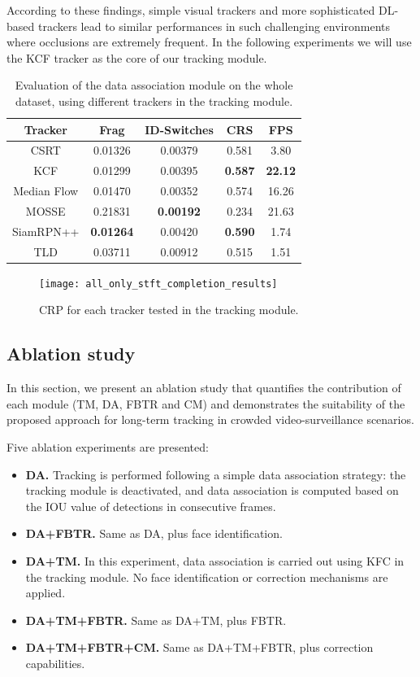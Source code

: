 According to these findings, simple visual trackers and more sophisticated DL-based trackers lead to similar performances in such challenging environments where occlusions are extremely frequent. In the following experiments we will use the KCF tracker as the core of our tracking module.

\begin{table}[h]
    \centering
    \small
    \begin{tabular}{ccccc}
        \toprule
        Tracker & Frag & ID-Switches & CRS & FPS\\
        \midrule
        CSRT & 0.01326 & 0.00379 & 0.581 & 3.80\\
        KCF & 0.01299 & 0.00395 & \textbf{0.587} & \textbf{22.12}\\
        Median Flow & 0.01470 & 0.00352 & 0.574 & 16.26\\
        MOSSE & 0.21831 & \textbf{0.00192} & 0.234 & 21.63\\
        SiamRPN++ & \textbf{0.01264} & 0.00420 & \textbf{0.590} & 1.74\\
        TLD & 0.03711 & 0.00912 & 0.515 & 1.51\\
        \bottomrule
    \end{tabular}
    \caption{Evaluation of the data association module on the whole dataset, using different trackers in the tracking module.}
    \label{tab:results_STFT}
\end{table}

\begin{figure}[h]
    \centering
    \texttt{[image: all\_only\_stft\_completion\_results]}
    \caption{CRP for each tracker tested in the tracking module.}
    \label{fig:stft_CRP}
\end{figure}


\subsection{Ablation study}

In this section, we present an ablation study that quantifies the contribution of each module (TM, DA, FBTR and CM) and demonstrates the suitability of the proposed approach for long-term tracking in crowded video-surveillance scenarios.

Five ablation experiments are presented: 

\begin{itemize}
    \item \textbf{DA.} Tracking is performed following a simple data association strategy: the tracking module is deactivated, and data association is computed based on the IOU value of detections in consecutive frames.
    \item \textbf{DA+FBTR.} Same as DA, plus face identification.
    \item \textbf{DA+TM.} In this experiment, data association is carried out using KFC in the tracking module. No face identification or correction mechanisms are applied.
    \item \textbf{DA+TM+FBTR.} Same as DA+TM, plus FBTR.
    \item \textbf{DA+TM+FBTR+CM.} Same as DA+TM+FBTR, plus correction capabilities.
\end{itemize}


